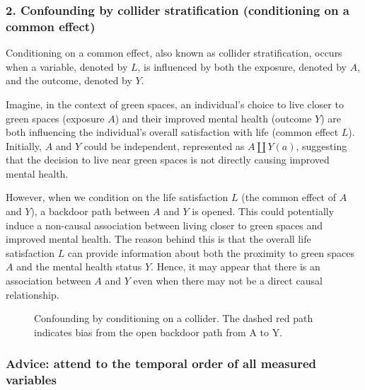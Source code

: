 \documentclass[
  singlecolumn]{article}
\begin{document}
\subsubsection{2. Confounding by collider stratification (conditioning
on a common
effect)}\label{confounding-by-collider-stratification-conditioning-on-a-common-effect}

Conditioning on a common effect, also known as collider stratification,
occurs when a variable, denoted by \(L\), is influenced by both the
exposure, denoted by \(A\), and the outcome, denoted by \(Y\).

Imagine, in the context of green spaces, an individual's choice to live
closer to green spaces (exposure \(A\)) and their improved mental health
(outcome \(Y\)) are both influencing the individual's overall
satisfaction with life (common effect \(L\)). Initially, \(A\) and \(Y\)
could be independent, represented as \(A \coprod Y(a)\), suggesting that
the decision to live near green spaces is not directly causing improved
mental health.

However, when we condition on the life satisfaction \(L\) (the common
effect of \(A\) and \(Y\)), a backdoor path between \(A\) and \(Y\) is
opened. This could potentially induce a non-causal association between
living closer to green spaces and improved mental health. The reason
behind this is that the overall life satisfaction \(L\) can provide
information about both the proximity to green spaces \(A\) and the
mental health status \(Y\). Hence, it may appear that there is an
association between \(A\) and \(Y\) even when there may not be a direct
causal relationship.

\begin{figure}[htb]


\caption{\label{fig-dag-common-effect}Confounding by conditioning on a
collider. The dashed red path indicates bias from the open backdoor path
from A to Y.}

\end{figure}%

\subsubsection{Advice: attend to the temporal order of all measured
variables}\label{advice-attend-to-the-temporal-order-of-all-measured-variables-1}
\end{document}
